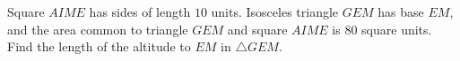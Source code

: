 Square $ AIME$ has sides of length $ 10$ units.  Isosceles triangle $ GEM$ has base $ EM$, and the area common to triangle $ GEM$ and square $ AIME$ is $ 80$ square units.  Find the length of the altitude to $ EM$ in $ \triangle GEM$.
